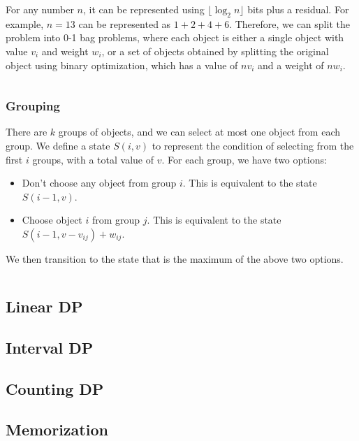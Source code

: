 \documentclass{article}
\begin{document}
For any number $n$, it can be represented using $\lfloor \log_2 n \rfloor$ bits plus a residual. For example, $n = 13$ can be represented as $1 + 2 + 4 + 6$. Therefore, we can split the problem into 0-1 bag problems, where each object is either a single object with value $v_i$ and weight $w_i$, or a set of objects obtained by splitting the original object using binary optimization, which has a value of $nv_i$ and a weight of $nw_i$.

\begin{center}
	\inputminted[firstline=12, lastline=26]{cpp}{src/struct-multiple-bag.cpp}
\end{center}

\subsubsection{Grouping}

There are $k$ groups of objects, and we can select at most one object from each group. We define a state $S(i, v)$ to represent the condition of selecting from the first $i$ groups, with a total value of $v$. For each group, we have two options:
\begin{itemize}
	\item Don't choose any object from group $i$. This is equivalent to the state $S(i - 1, v)$.
	\item Choose object $i$ from group $j$. This is equivalent to the state $S(i - 1, v - v_{ij}) + w_{ij}$.
\end{itemize}

We then transition to the state that is the maximum of the above two options.

\begin{center}
	\inputminted{cpp}{src/struct-group-bag.cpp}
\end{center}


\subsection{Linear DP}
\subsection{Interval DP}
\subsection{Counting DP}
\subsection{Memorization}
\end{document}
